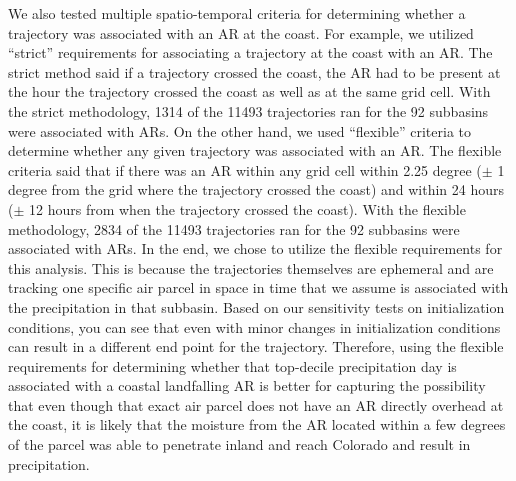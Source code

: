 \documentclass[draft]{agujournal2019}
\begin{document}
We also tested multiple spatio-temporal criteria for determining whether a trajectory was associated with an AR at the coast. For example, we utilized “strict” requirements for associating a trajectory at the coast with an AR. The strict method said if a trajectory crossed the coast, the AR had to be present at the hour the trajectory crossed the coast as well as at the same grid cell. With the strict methodology, 1314 of the 11493 trajectories ran for the 92 subbasins were associated with ARs. On the other hand, we used “flexible” criteria to determine whether any given trajectory was associated with an AR. The flexible criteria said that if there was an AR within any grid cell within 2.25 degree ($\pm$ 1 degree from the grid where the trajectory crossed the coast) and within 24 hours ($\pm$ 12 hours from when the trajectory crossed the coast). With the flexible methodology, 2834 of the 11493 trajectories ran for the 92 subbasins were associated with ARs. In the end, we chose to utilize the flexible requirements for this analysis. This is because the trajectories themselves are ephemeral and are tracking one specific air parcel in space in time that we assume is associated with the precipitation in that subbasin. Based on our sensitivity tests on initialization conditions, you can see that even with minor changes in initialization conditions can result in a different end point for the trajectory. Therefore, using the flexible requirements for determining whether that top-decile precipitation day is associated with a coastal landfalling AR is better for capturing the possibility that even though that exact air parcel does not have an AR directly overhead at the coast, it is likely that the moisture from the AR located within a few degrees of the parcel was able to penetrate inland and reach Colorado and result in precipitation.

%
%
%
\end{document}
